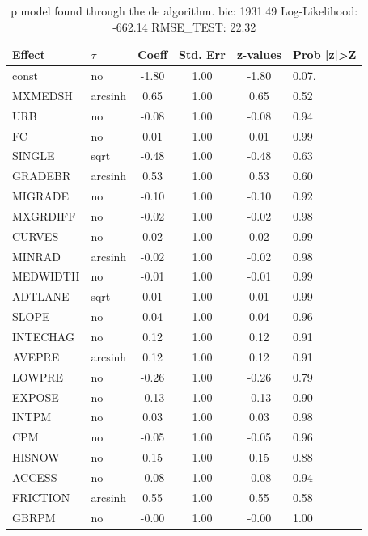 \begin{table}
	\caption{p model found through the de algorithm. bic: 1931.49 Log-Likelihood: -662.14 RMSE_TEST: 22.32}
	\begin{center}
		\begin{tabular}{|l|l|c|c|c|l|}
			\hline
			Effect & $\tau$ & Coeff & Std. Err & z-values & Prob |z|>Z \\
			\hline
			const & no & -1.80 & 1.00 & -1.80 & 0.07. \\
			\hline
			MXMEDSH & arcsinh & 0.65 & 1.00 & 0.65 & 0.52 \\
			\hline
			URB & no & -0.08 & 1.00 & -0.08 & 0.94 \\
			\hline
			FC & no & 0.01 & 1.00 & 0.01 & 0.99 \\
			\hline
			SINGLE & sqrt & -0.48 & 1.00 & -0.48 & 0.63 \\
			\hline
			GRADEBR & arcsinh & 0.53 & 1.00 & 0.53 & 0.60 \\
			\hline
			MIGRADE & no & -0.10 & 1.00 & -0.10 & 0.92 \\
			\hline
			MXGRDIFF & no & -0.02 & 1.00 & -0.02 & 0.98 \\
			\hline
			CURVES & no & 0.02 & 1.00 & 0.02 & 0.99 \\
			\hline
			MINRAD & arcsinh & -0.02 & 1.00 & -0.02 & 0.98 \\
			\hline
			MEDWIDTH & no & -0.01 & 1.00 & -0.01 & 0.99 \\
			\hline
			ADTLANE & sqrt & 0.01 & 1.00 & 0.01 & 0.99 \\
			\hline
			SLOPE & no & 0.04 & 1.00 & 0.04 & 0.96 \\
			\hline
			INTECHAG & no & 0.12 & 1.00 & 0.12 & 0.91 \\
			\hline
			AVEPRE & arcsinh & 0.12 & 1.00 & 0.12 & 0.91 \\
			\hline
			LOWPRE & no & -0.26 & 1.00 & -0.26 & 0.79 \\
			\hline
			EXPOSE & no & -0.13 & 1.00 & -0.13 & 0.90 \\
			\hline
			INTPM & no & 0.03 & 1.00 & 0.03 & 0.98 \\
			\hline
			CPM & no & -0.05 & 1.00 & -0.05 & 0.96 \\
			\hline
			HISNOW & no & 0.15 & 1.00 & 0.15 & 0.88 \\
			\hline
			ACCESS & no & -0.08 & 1.00 & -0.08 & 0.94 \\
			\hline
			FRICTION & arcsinh & 0.55 & 1.00 & 0.55 & 0.58 \\
			\hline
			GBRPM & no & -0.00 & 1.00 & -0.00 & 1.00 \\

\end{tabular}
\end{center}
\end{table}
